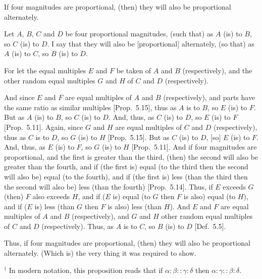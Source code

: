 \begin{Parallel}{}{}
{If four magnitudes are proportional, (then) they will
also be proportional alternately.

Let $A$, $B$, $C$ and $D$ be four proportional magnitudes, (such that) as $A$
(is) to $B$, so $C$ (is) to $D$. I say that they will also be [proportional]
 alternately, (so that) as $A$ (is) to $C$, so $B$ (is) to $D$.
 
For let the equal multiples $E$ and $F$ be taken of $A$ and $B$ (respectively),
and the other random equal multiples $G$ and $H$ of $C$ and $D$ (respectively).

\epsfysize=1in
\centerline{}

And since $E$ and $F$ are equal multiples of $A$ and $B$ (respectively),
and parts  have the same ratio as similar multiples [Prop.~5.15], thus as $A$ is to $B$, so $E$ (is) to $F$.
But as $A$ (is) to $B$, so $C$ (is) to $D$. And, thus, as $C$ (is) to $D$, so
$E$ (is) to $F$ [Prop.~5.11].
Again, since $G$ and $H$ are equal multiples of $C$ and $D$ (respectively),  thus
as $C$  is to $D$, so $G$ (is) to $H$ [Prop.~5.15].
But as $C$ (is) to $D$, [so] $E$ (is) to $F$. And, thus, as $E$ (is) to $F$, so
$G$ (is) to $H$ [Prop.~5.11]. And if four magnitudes are proportional, and the first is greater than the third, (then)
the second will also be greater than the fourth, and if (the first is) equal
(to the third then the second will also be) equal (to the fourth), and if
(the first is) less (than the third then the second will also be) less (than the fourth)
[Prop.~5.14]. Thus, if $E$ exceeds $G$ (then)
$F$ also exceeds $H$, and if ($E$ is) equal (to $G$ then $F$ is also) equal (to $H$), and if
($E$ is) less (than $G$ then $F$ is also) less (than $H$). And $E$ and $F$ are equal multiples of $A$ and $B$ (respectively), and $G$ and $H$ other random equal multiples
of $C$ and $D$ (respectively). Thus, as $A$ is to $C$, so $B$ (is) to $D$ [Def.~5.5].

Thus, if four magnitudes are proportional, (then) they will
also be proportional  alternately. (Which is) the very thing it was required to show.}
\end{Parallel}
{\footnotesize \noindent$^\dag$ In modern notation, this proposition
reads that if $\alpha:\beta::\gamma:\delta$ then $\alpha:\gamma::\beta:\delta$.}

